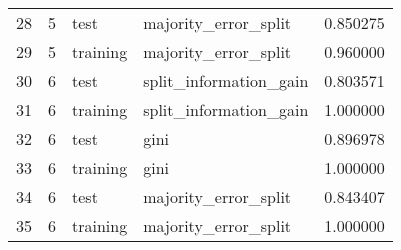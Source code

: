 \begin{tabular}{lrllr}
28 & 5 & test & majority_error_split & 0.850275 \\
29 & 5 & training & majority_error_split & 0.960000 \\
30 & 6 & test & split_information_gain & 0.803571 \\
31 & 6 & training & split_information_gain & 1.000000 \\
32 & 6 & test & gini & 0.896978 \\
33 & 6 & training & gini & 1.000000 \\
34 & 6 & test & majority_error_split & 0.843407 \\
35 & 6 & training & majority_error_split & 1.000000 \\
\end{tabular}

